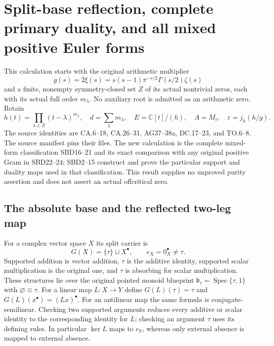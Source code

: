 \section{Split-base reflection, complete primary duality, and all mixed positive Euler forms}
\label{sec:split-base-mixed-duality}

This calculation starts with the original arithmetic multiplier
\[
 g(s)=2\xi(s)=s(s-1)\pi^{-s/2}\Gamma(s/2)\zeta(s)
\]
and a finite, nonempty symmetry-closed set $Z$ of its actual nontrivial
zeros, each with its actual full order $m_\lambda$. No auxiliary root
is admitted as an arithmetic zero. Retain
\[
 h(t)=\prod_{\lambda\in Z}(t-\lambda)^{m_\lambda},\quad
 d=\sum_\lambda m_\lambda,\quad E=\mathbb C[t]/(h),\quad
 A=M_t,\quad \varepsilon=j_h(h/g).
 \tag{SBD1}
\]
The source identities are CA.6--18, CA.26--31, AG37--38a,
DC.17--23, and TO.6--8. The source manifest pins their files.
The new calculation is the complete mixed-form classification SBD16--21
and its exact comparison with any original positive Gram in SBD22--24;
SBD2--15 construct and prove the particular support and duality maps
used in that classification. This result supplies no unproved purity
assertion and does not assert an actual offcritical zero.

\subsection{The absolute base and the reflected two-leg map}

For a complex vector space $X$ its split carrier is
\[
 G(X)=\{\tau\}\sqcup X^\bullet,\qquad e_X=0_X^\bullet\ne\tau.
 \tag{SBD2}
\]
Supported addition is vector addition, $\tau$ is the additive identity,
supported scalar multiplication is the original one, and $\tau$ is
absorbing for scalar multiplication. These structures lie over the
original pointed monoid blueprint
$\mathfrak b_\tau=\operatorname{Spec}\{\tau,1\}$ with
$\varnothing\equiv\tau$. For a linear map $L:X\to Y$ define
$G(L)(\tau)=\tau$ and $G(L)(x^\bullet)=(Lx)^\bullet$.
For an antilinear map the same formula is conjugate-semilinear.
Checking two supported arguments reduces every additive or scalar
identity to the corresponding identity for $L$; checking an argument
$\tau$ uses its defining rules. In particular $\ker L$ maps to $e_Y$,
whereas only external absence is mapped to external absence.


